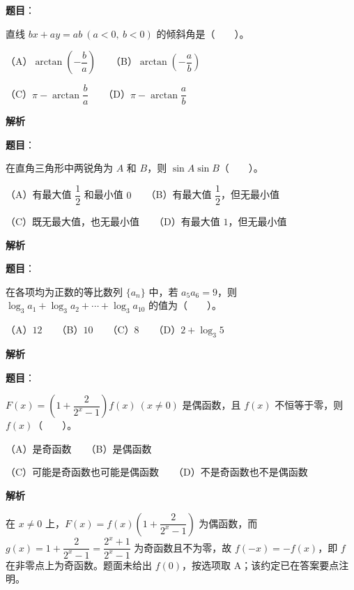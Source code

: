 \begin{answer}

\textbf{题目}：

直线 $bx+ay=ab\ (a<0,\ b<0)$ 的倾斜角是\mbox{（　　）}。

（A）$\arctan\left(-\dfrac ba\right)$　　（B）$\arctan\left(-\dfrac ab\right)$

（C）$\pi-\arctan\dfrac ba$　　（D）$\pi-\arctan\dfrac ab$

\textbf{解析}


\end{answer}
\begin{answer}

\textbf{题目}：

在直角三角形中两锐角为 $A$ 和 $B$，则 $\sin A\sin B$\mbox{（　　）}。

（A）有最大值 $\dfrac12$ 和最小值 $0$　　（B）有最大值 $\dfrac12$，但无最小值

（C）既无最大值，也无最小值　　（D）有最大值 $1$，但无最小值

\textbf{解析}


\end{answer}
\begin{answer}

\textbf{题目}：

在各项均为正数的等比数列 $\{a_n\}$ 中，若 $a_5a_6=9$，则 $\log_3a_1+\log_3a_2+\cdots+\log_3a_{10}$ 的值为\mbox{（　　）}。

（A）$12$　　（B）$10$　　（C）$8$　　（D）$2+\log_3 5$

\textbf{解析}


\end{answer}
\begin{answer}

\textbf{题目}：

$F(x)=\left(1+\dfrac{2}{2^x-1}\right)f(x)\ (x\ne0)$ 是偶函数，且 $f(x)$ 不恒等于零，则 $f(x)$\mbox{（　　）}。

（A）是奇函数　　（B）是偶函数

（C）可能是奇函数也可能是偶函数　　（D）不是奇函数也不是偶函数

\textbf{解析}

在 \(x\ne0\) 上，\(F(x)=f(x)\left(1+\dfrac{2}{2^x-1}\right)\) 为偶函数，而 \(g(x)=1+\dfrac{2}{2^x-1}=\dfrac{2^x+1}{2^x-1}\) 为奇函数且不为零，故 \(f(-x)=-f(x)\)，即 \(f\) 在非零点上为奇函数。题面未给出 \(f(0)\)，按选项取 A；该约定已在答案要点注明。


\end{answer}
